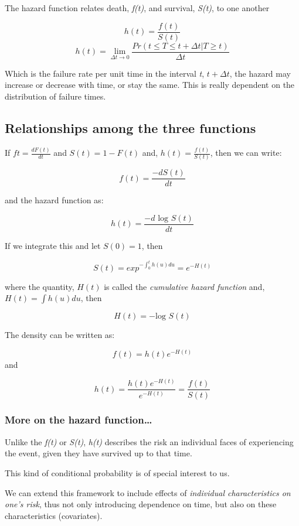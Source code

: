 \documentclass[
]{article}
\begin{document}
The hazard function relates death, \emph{f(t)}, and survival, \emph{S(t)}, to one another

\[h(t) = \frac{f(t)}{S(t)}\]
\[h(t) = \lim_{\Delta t \rightarrow 0} \frac{Pr(t \leqslant T \leqslant t + \Delta t | T \geqslant t)}{\Delta t}\]

Which is the failure rate per unit time in the interval \emph{t}, \(t+\Delta t\), the hazard may increase or decrease with time, or stay the same. This is really dependent on the distribution of failure times.

\hypertarget{relationships-among-the-three-functions}{%
\subsection{Relationships among the three functions}\label{relationships-among-the-three-functions}}

If \(ft = \frac{dF(t)}{dt}\) and \(S(t) = 1- F(t)\) and, \(h(t) = \frac{f(t)}{S(t)}\), then we can write:

\[f(t) = \frac{-dS(t)}{dt}\]

and the hazard function as:

\[h(t) = \frac{-d \text{ log } S(t)}{dt}\]

If we integrate this and let \(S(0)=1\), then

\[S(t) = exp^{-\int_{0}^t h(u) du} = e^{-H(t)}\]

where the quantity, \(H(t)\) is called the \emph{cumulative hazard function} and, \(H(t) = \int h(u) du\), then

\[H(t) = -\text{log }  S(t)\]

The density can be written as:

\[f(t) = h(t) e ^{-H(t)}\]
and

\[h(t) = \frac{h(t) e^{-H(t)}}{e^{-H(t)}} = \frac{f(t)}{S(t)}\]

\hypertarget{more-on-the-hazard-function}{%
\subsubsection{More on the hazard function\ldots{}}\label{more-on-the-hazard-function}}

Unlike the \emph{f(t)} or \emph{S(t)}, \emph{h(t)} describes the risk an individual faces of experiencing the event, given they have survived up to that time.

This kind of conditional probability is of special interest to us.

We can extend this framework to include effects of \emph{individual characteristics on one's risk}, thus not only introducing dependence on time, but also on these characteristics (covariates).
\end{document}
